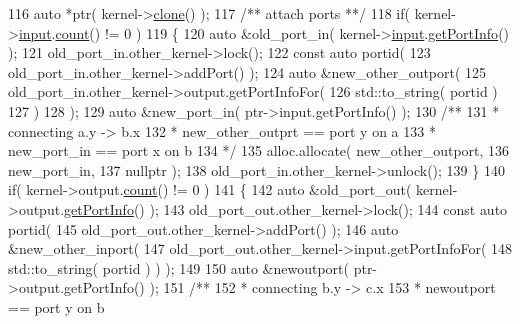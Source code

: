\begin{DoxyCode}
116          \textcolor{keyword}{auto} *ptr( kernel->\hyperlink{classraft_1_1kernel_a71bfffbbb3d40949e19be32e3d8f467f}{clone}() );\textcolor{comment}{}
117 \textcolor{comment}{         /** attach ports **/}
118          \textcolor{keywordflow}{if}( kernel->\hyperlink{classraft_1_1kernel_a6edbe35a56409d402e719b3ac36d6554}{input}.\hyperlink{class_port_a33562ea87ac7e83a32441da40cbd9279}{count}() != 0 )
119          \{
120             \textcolor{keyword}{auto} &old\_port\_in( kernel->\hyperlink{classraft_1_1kernel_a6edbe35a56409d402e719b3ac36d6554}{input}.\hyperlink{class_port_a4af1cb062940ca3b83c569f024b9a8d1}{getPortInfo}() );
121             old\_port\_in.other\_kernel->lock();
122             \textcolor{keyword}{const} \textcolor{keyword}{auto} portid(
123                old\_port\_in.other\_kernel->addPort() );
124             \textcolor{keyword}{auto} &new\_other\_outport(
125                old\_port\_in.other\_kernel->output.getPortInfoFor(
126                   std::to\_string( portid )
127                )
128             );
129             \textcolor{keyword}{auto} &new\_port\_in( ptr->input.getPortInfo() );\textcolor{comment}{}
130 \textcolor{comment}{            /**}
131 \textcolor{comment}{             * connecting a.y -> b.x}
132 \textcolor{comment}{             * new\_other\_outprt == port y on a}
133 \textcolor{comment}{             * new\_port\_in      == port x on b}
134 \textcolor{comment}{             */}
135             alloc.allocate( new\_other\_outport,
136                             new\_port\_in,
137                             \textcolor{keyword}{nullptr} );
138             old\_port\_in.other\_kernel->unlock();
139          \}
140          \textcolor{keywordflow}{if}( kernel->output.\hyperlink{class_port_a33562ea87ac7e83a32441da40cbd9279}{count}() != 0 )
141          \{
142             \textcolor{keyword}{auto} &old\_port\_out( kernel->output.\hyperlink{class_port_a4af1cb062940ca3b83c569f024b9a8d1}{getPortInfo}() );
143             old\_port\_out.other\_kernel->lock();
144             \textcolor{keyword}{const} \textcolor{keyword}{auto} portid(
145                old\_port\_out.other\_kernel->addPort() );
146             \textcolor{keyword}{auto} &new\_other\_inport(
147                old\_port\_out.other\_kernel->input.getPortInfoFor(
148                   std::to\_string( portid ) ) );
149 
150             \textcolor{keyword}{auto} &newoutport( ptr->output.getPortInfo() );\textcolor{comment}{}
151 \textcolor{comment}{            /**}
152 \textcolor{comment}{             * connecting b.y -> c.x}
153 \textcolor{comment}{             * newoutport       == port y on b}

\end{DoxyCode}
